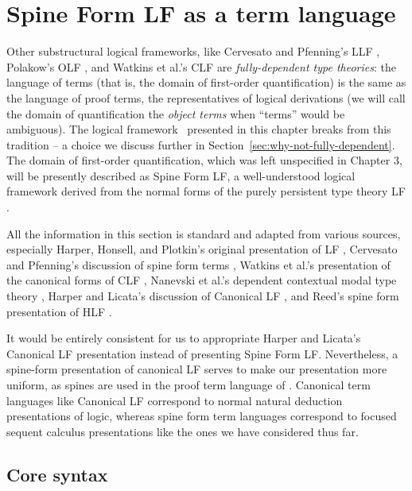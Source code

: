 \section{Spine Form LF as a term language}
\label{sec:sls-termlanguage}

Other substructural logical frameworks, like Cervesato and Pfenning's
LLF \cite{cervesato02linear}, Polakow's OLF \cite{polakow01ordered},
and Watkins et al.'s CLF \cite{watkins02concurrent} are {\it
  fully-dependent type theories}: the language of terms (that is, the
domain of first-order quantification) is the same as the language of
proof terms, the representatives of logical derivations (we will call
the domain of quantification the {\it object terms} when ``terms''
would be ambiguous). The logical framework \sls~presented in this
chapter breaks from this tradition -- a choice we discuss further in
Section~\ref{sec:why-not-fully-dependent}. The domain of first-order
quantification, which was left unspecified in Chapter 3, will be
presently described as Spine Form LF, a well-understood logical
framework derived from the normal forms of the purely persistent type
theory LF \cite{harper93framework}.

All the information in this section is standard and adapted from
various sources, especially Harper, Honsell, and Plotkin's original
presentation of LF \cite{harper93framework}, Cervesato and Pfenning's
discussion of spine form terms \cite{cervesato02linear}, Watkins et
al.'s presentation of the canonical forms of CLF
\cite{watkins02concurrent}, Nanevski et al.'s dependent contextual
modal type theory \cite{nanevski08contextual}, Harper and Licata's
discussion of Canonical LF \cite{harper07mechanizing}, and Reed's
spine form presentation of HLF \cite{reed09hybrid}.

It would be entirely consistent for us to appropriate Harper and
Licata's Canonical LF presentation instead of presenting Spine Form
LF. Nevertheless, a spine-form presentation of canonical LF serves to
make our presentation more uniform, as spines are used in the proof
term language of \sls. Canonical term languages like Canonical LF
correspond to normal natural deduction presentations of logic, whereas
spine form term languages correspond to focused sequent calculus
presentations like the ones we have considered thus far.

\subsection{Core syntax}

